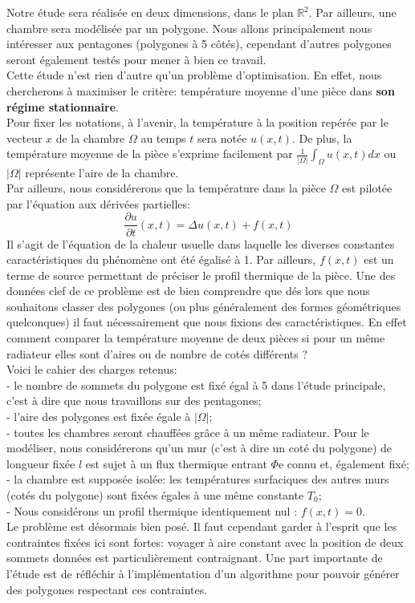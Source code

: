 \documentclass[a4paper,reqno]{article}
\begin{document}
Notre étude sera réalisée en deux dimensions, dans le plan $\mathbb{R}^2$. Par ailleurs, une chambre sera modélisée par un polygone. Nous allons principalement nous intéresser aux pentagones (polygones à 5 côtés), cependant d'autres polygones seront également testés pour mener à bien ce travail. \\
Cette étude n'est rien d'autre qu'un problème d'optimisation. En effet, nous chercherons à maximiser le critère: température moyenne d'une pièce dans \textbf{son régime stationnaire}. \\ Pour fixer les notations, à l'avenir, la température à la position repérée par le vecteur $x$ de la chambre $\Omega$ au temps $t$ sera notée $u(x,t)$. De plus, la température moyenne de la pièce s'exprime facilement par  $ \frac {1}{|\Omega|}\int_{\Omega} u(x,t) dx $ ou $|\Omega|$ représente l'aire de la chambre.\\
Par ailleurs, nous considérerons que la température dans la pièce $\Omega$ est pilotée par l'équation aux dérivées partielles: 
\\
\begin{equation}
\frac{\partial u}{\partial t}(x,t) = \Delta u(x,t) + f(x,t)
\end{equation}
Il s'agit de l'équation de la chaleur usuelle dans laquelle les diverses constantes caractéristiques du phénomène ont été égalisé à 1. Par ailleurs, $f(x,t)$ est un terme de source permettant de préciser le profil thermique de la pièce.
Une des données clef de ce problème est de bien comprendre que dés lors que nous souhaitons classer des polygones (ou plus généralement des formes géométriques quelconques) il faut nécessairement que nous fixions des caractéristiques. En effet comment comparer la température moyenne de deux pièces si pour un même radiateur elles sont d'aires ou de nombre de cotés différents ? \\
Voici le cahier des charges retenus: \\
- le nombre de sommets du polygone est fixé égal à 5 dans l'étude principale, c'est à dire que nous travaillons sur des pentagones; \\
- l'aire des polygones est fixée égale à $|\Omega|$; \\
- toutes les chambres seront chauffées grâce à un même radiateur. Pour le modéliser, nous considérerons qu'un mur (c'est à dire un coté du polygone) de longueur fixée $l$ est sujet à un flux thermique entrant $\Phi$e connu et, également fixé;  \\
- la chambre est supposée isolée: les températures surfaciques des autres murs (cotés du polygone) sont fixées égales à une même constante $T_{0}$; \\
- Nous considérons un profil thermique identiquement nul : $f(x,t)  = 0$.
\\
Le problème est désormais bien posé. Il faut cependant garder à l'esprit que les contraintes fixées ici sont fortes: voyager à aire constant avec la position de deux sommets données est particulièrement contraignant. Une part importante de l'étude est de réfléchir à l'implémentation d'un algorithme pour pouvoir générer des polygones respectant ces contraintes.
\end{document}
